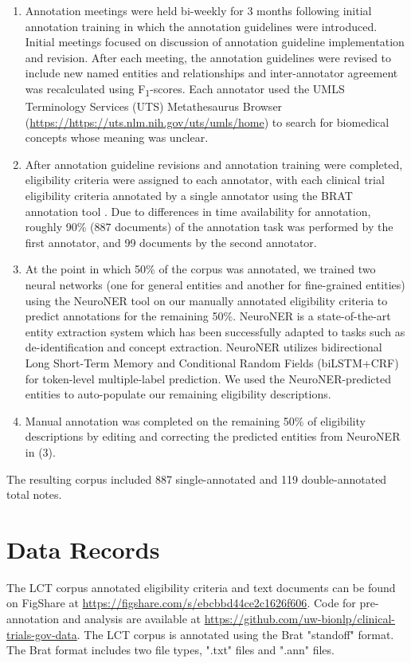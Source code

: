 \documentclass[fleqn,10pt]{wlscirep}
\begin{document}
\begin{enumerate}
    \item Annotation meetings were held bi-weekly for 3 months following initial annotation training in which the annotation guidelines were introduced. Initial meetings focused on discussion of annotation guideline implementation and revision. After each meeting, the annotation guidelines were revised to include new named entities and relationships and inter-annotator agreement was recalculated using F\textsubscript{1}-scores. Each annotator used the UMLS Terminology Services (UTS) Metathesaurus Browser (\url{https://https://uts.nlm.nih.gov/uts/umls/home}) to search for biomedical concepts whose meaning was unclear.
    \item After annotation guideline revisions and annotation training were completed, eligibility criteria were assigned to each annotator, with each clinical trial eligibility criteria annotated by a single annotator using the BRAT annotation tool \cite{stenetorp2012brat}. Due to differences in time availability for annotation, roughly 90\% (887 documents) of the annotation task was performed by the first annotator, and 99 documents by the second annotator.
    \item At the point in which 50\% of the corpus was annotated, we trained two neural networks (one for general entities and another for fine-grained entities) using the NeuroNER tool \cite{dernoncourt2017neuroner} on our manually annotated eligibility criteria to predict annotations for the remaining 50\%. NeuroNER is a state-of-the-art entity extraction system which has been successfully adapted to tasks such as de-identification and concept extraction. NeuroNER utilizes bidirectional Long Short-Term Memory and Conditional Random Fields (biLSTM+CRF) for token-level multiple-label prediction. We used the NeuroNER-predicted entities to auto-populate our remaining eligibility descriptions.
    \item Manual annotation was completed on the remaining 50\% of eligibility descriptions by editing and correcting the predicted entities from NeuroNER in (3).

\end{enumerate}    
    
\noindent The resulting corpus included 887 single-annotated and 119 double-annotated total notes. 

\section*{Data Records}
\label{sec:data_records}
The LCT corpus annotated eligibility criteria and text documents can be found on FigShare at \url{https://figshare.com/s/ebcbbd44ce2c1626f606}. Code for pre-annotation and analysis are available at \url{https://github.com/uw-bionlp/clinical-trials-gov-data}. The LCT corpus is annotated using the Brat "standoff" format. The Brat format includes two file types, ".txt" files and ".ann" files. \\
\end{document}
